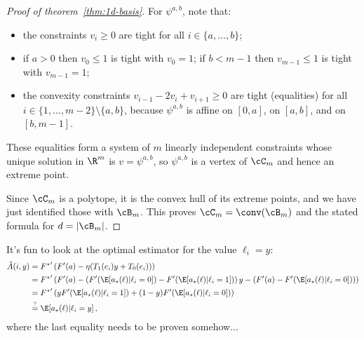 \begin{proof}[Proof of theorem~\ref{thm:1d-basis}]
    For $\psi^{a,b}$, note that:
    \begin{itemize}
        \item the constraints $v_i\ge 0$ are tight for all $i\in\{a,\dots,b\}$;
        \item if $a>0$ then $v_0\le 1$ is tight with $v_0=1$; if $b<m-1$ then
              $v_{m-1}\le 1$ is tight with $v_{m-1}=1$;
        \item the convexity constraints $v_{i-1}-2v_i+v_{i+1}\ge 0$ are tight
              (equalities) for all $i\in\{1,\dots,m-2\}\setminus\{a,b\}$, because
              $\psi^{a,b}$ is affine on $[0,a]$, on $[a,b]$, and on $[b,m-1]$.
    \end{itemize}
    These equalities form a system of $m$ linearly independent constraints whose
    unique solution in $\R^m$ is $v=\psi^{a,b}$, so $\psi^{a,b}$ is a vertex of $\cC_m$
    and hence an extreme point.

    \smallskip
    Since $\cC_m$ is a polytope, it is the convex hull of its extreme points, and
    we have just identified those with $\cB_m$.
    This proves $\cC_m=\conv(\cB_m)$ and the stated formula for $d=|\cB_m|$.
\end{proof}


\newpage
It's fun to look at the optimal estimator for the value $\ell_i = y$:
\begin{align*}
    \tilde{A}(i,y) & =
    {F^\star}'\left(F'(a) - \eta (T_1(e_i)y + T_0(e_i))\right)       \\
                   & =
    {F^\star}'\left(F'(a)
    - \left(F'(\E[a_\star(\ell) | \ell_i = 0])
    - F'(\E[a_\star(\ell) | \ell_i = 1])\right)y
    - \left(F'(a) - F'(\E[a_\star(\ell) | \ell_i = 0])\right)\right) \\
                   & =
    {F^\star}'\left(y F'(\E[a_\star(\ell) | \ell_i = 1])
    + (1 - y) F'(\E[a_\star(\ell) | \ell_i = 0])\right)              \\
                   & \stackrel{?}{=}
    \E[a_\star(\ell) | \ell_i = y]\,,
\end{align*}
where the last equality needs to be proven somehow...


